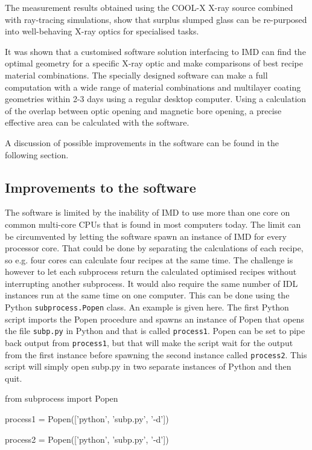 The measurement results obtained using the COOL-X X-ray source combined with ray-tracing simulations, show that surplus slumped glass can be re-purposed into well-behaving X-ray optics for specialised tasks.

It was shown that a customised software solution interfacing to IMD can find the optimal geometry for a specific X-ray optic and make comparisons of best recipe material combinations. The specially designed software can make a full computation with a wide range of material combinations and multilayer coating geometries within 2-3 days using a regular desktop computer. Using a calculation of the overlap between optic opening and magnetic bore opening, a precise effective area can be calculated with the software.

A discussion of possible improvements in the software can be found in the following section.

\subsection{Improvements to the software}\label{sec:software_improvements}
The software is limited by the inability of IMD to use more than one core on common multi-core CPUs that is found in most computers today. The limit can be circumvented by letting the software spawn an instance of IMD for every processor core. That could be done by separating the calculations of each recipe, so e.g. four cores can calculate four recipes at the same time. The challenge is however to let each subprocess return the calculated optimised recipes without interrupting another subprocess. It would also require the same number of IDL instances run at the same time on one computer. This can be done using the Python \verb|subprocess.Popen| class. An example is given here. The first Python script imports the Popen procedure and spawns an instance of Popen that opens the file \verb|subp.py| in Python and that is called \verb|process1|. Popen can be set to pipe back output from \verb|process1|, but that will make the script wait for the output from the first instance before spawning the second instance called \verb|process2|. This script will simply open subp.py in two separate instances of Python and then quit.

\begin{verbcode}
from subprocess import Popen

process1 = Popen(['python', 'subp.py', '-d'])

process2 = Popen(['python', 'subp.py', '-d'])
\end{verbcode}

